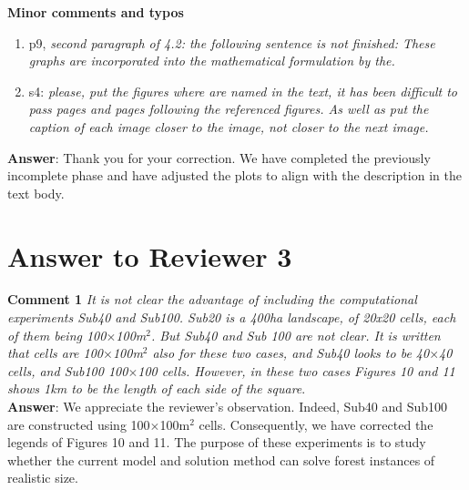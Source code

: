 \documentclass[12pt]{article}
\begin{document}
\noindent \textbf{Minor comments and typos}
\begin{enumerate}
    \item p9, \textit{second paragraph of 4.2: the following sentence is not finished: These graphs are incorporated into the mathematical formulation by the.}
    \item s4: \textit{please, put the figures where are named in the text, it has been difficult to pass pages and pages following the referenced figures. As well as put the caption of each image closer to the image, not closer to the next image.}
    \\\end{enumerate}

\textbf{Answer}: Thank you for your correction. We have completed the previously incomplete phase and have adjusted the plots to align with the description in the text body.

\section*{Answer to Reviewer 3}
\noindent \textbf{Comment 1} \textit{It is not clear the advantage of including the computational experiments Sub40 and Sub100. Sub20 is a 400ha landscape, of 20x20 cells, each of them being 100$\times$100m$^2$. But Sub40 and Sub 100 are not clear. It is written that cells are 100$\times$100m$^2$ also for these two cases, and Sub40 looks to be 40$\times$40 cells, and Sub100 100$\times$100 cells. However, in these two cases Figures 10 and 11 shows 1km to be the length of each side of the square}. \\

\textbf{Answer}: We appreciate the reviewer’s observation. Indeed, Sub40 and Sub100 are constructed using 100$\times$100m$^2$ cells. Consequently, we have corrected the legends of Figures 10 and 11. The purpose of these experiments is to study whether the current model and solution method can solve forest instances of realistic size. \\
\end{document}
